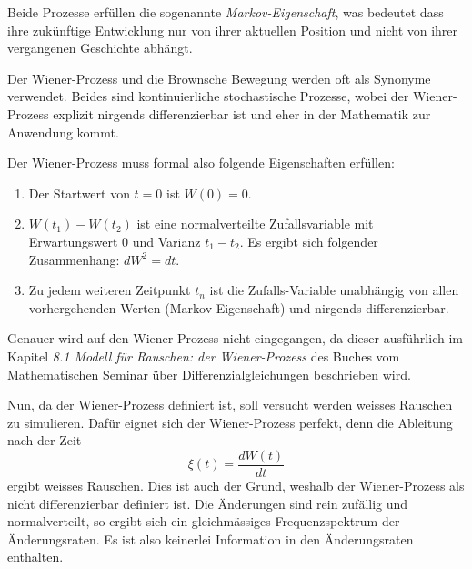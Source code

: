 Beide Prozesse erfüllen die sogenannte \textit{Markov-Eigenschaft}, was bedeutet dass ihre zukünftige Entwicklung nur von ihrer aktuellen Position und nicht von ihrer vergangenen Geschichte abhängt.

Der Wiener-Prozess und die Brownsche Bewegung werden oft als Synonyme verwendet. Beides sind kontinuierliche stochastische Prozesse, wobei der Wiener-Prozess explizit nirgends differenzierbar ist und eher in der Mathematik zur Anwendung kommt.

Der Wiener-Prozess muss formal also folgende Eigenschaften erfüllen: 

\begin{enumerate}
	\item Der Startwert von $ t = 0 $ ist $ W(0) = 0 $.
	\item $ W(t_{1}) - W(t_{2}) $ ist eine normalverteilte Zufallsvariable mit Erwartungswert 0 und Varianz $ t_{1} - t_{2} $. Es ergibt sich folgender Zusammenhang: $ dW^2 = dt $.
	\item Zu jedem weiteren Zeitpunkt $ t_{n} $ ist die Zufalls-Variable unabhängig von allen vorhergehenden Werten (Markov-Eigenschaft) und nirgends differenzierbar.
\end{enumerate}


Genauer wird auf den Wiener-Prozess nicht eingegangen, da dieser ausführlich im Kapitel \textit{8.1 Modell für Rauschen: der Wiener-Prozess} des Buches \cite{brown:Differenzialgleichungen} vom Mathematischen Seminar über Differenzialgleichungen beschrieben wird.


Nun, da der Wiener-Prozess definiert ist, soll versucht werden weisses Rauschen zu simulieren. Dafür eignet sich der Wiener-Prozess perfekt, denn die Ableitung nach der Zeit
\begin{equation}
	\xi(t) = \frac{dW(t)}{dt}
\end{equation}
ergibt weisses Rauschen. Dies ist auch der Grund, weshalb der Wiener-Prozess als nicht differenzierbar definiert ist. Die Änderungen sind rein zufällig und normalverteilt, so ergibt sich ein gleichmässiges Frequenzspektrum der Änderungsraten. Es ist also keinerlei Information in den Änderungsraten enthalten.


